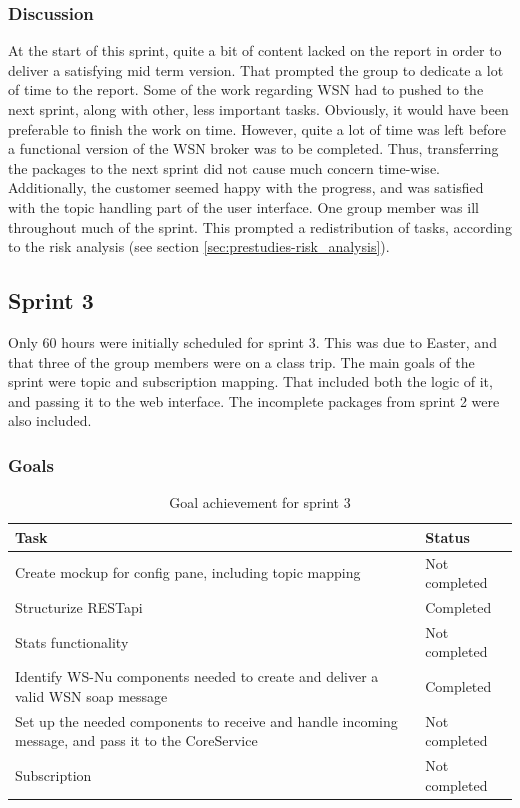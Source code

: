 \subsubsection{Discussion}
\label{subsec:project_lifecycle-development-sprint_2-discussion}

At the start of this sprint, quite a bit of content lacked on the report in order to deliver a satisfying mid term version. That prompted the group to dedicate a lot of time to the report. Some of the work regarding WSN had to pushed to the next sprint, along with other, less important tasks. Obviously, it would have been preferable to finish the work on time. However, quite a lot of time was left before a functional version of the WSN broker was to be completed. Thus, transferring the packages to the next sprint did not cause much concern time-wise. Additionally, the customer seemed happy with the progress, and was satisfied with the topic handling part of the user interface. One group member was ill throughout much of the sprint. This prompted a redistribution of tasks, according to the risk analysis (see section \ref{sec:prestudies-risk_analysis}).

\subsection{Sprint 3}
\label{subsec:project_lifecycle-development-sprint_3}

Only 60 hours were initially scheduled for sprint 3. This was due to Easter, and that three of the group members were on a class trip. The main goals of the sprint were topic and subscription mapping. That included both the logic of it, and passing it to the web interface. The incomplete packages from sprint 2 were also included.

\subsubsection{Goals}
\label{subsec:project_lifecycle-development-sprint_3-goals}

\begin{table}[ht!]
\small
\centering
\begin{tabular}{ | p{10cm} | p{2cm} |}
\hline
\rowcolor{lightgray}
 \textbf{Task} & \textbf{Status} \\
\hline
\rowcolor{orange!40}
Create mockup for config pane, including topic mapping & Not completed \\
\rowcolor{green!30}
Structurize RESTapi & Completed \\
\rowcolor{orange!40}
Stats functionality & Not completed \\
\rowcolor{green!30}
Identify WS-Nu components needed to create and deliver a valid WSN soap message & Completed \\
\rowcolor{orange!40}
Set up the needed components to receive and handle incoming message, and pass it to the CoreService & Not completed \\
\rowcolor{orange!40}
Subscription & Not completed \\
\hline
\end{tabular}
\caption{Goal achievement for sprint 3}
\label{tab:sprint 3, goals}
\end{table}

